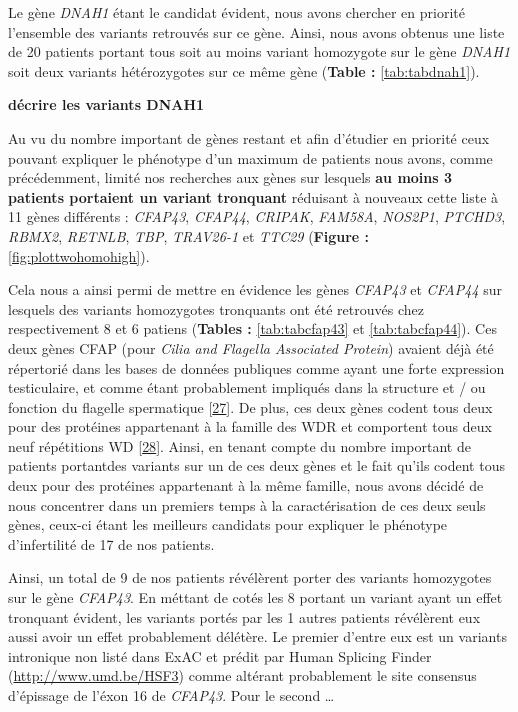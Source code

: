 \documentclass[12pt,twoside]{reedthesis}
\theoremstyle{definition}
\theoremstyle{definition}
\theoremstyle{remark}
\begin{document}
  Le gène \emph{DNAH1} étant le candidat évident, nous avons chercher en
  priorité l'ensemble des variants retrouvés sur ce gène. Ainsi, nous
  avons obtenus une liste de 20 patients portant tous soit au moins
  variant homozygote sur le gène \emph{DNAH1} soit deux variants
  hétérozygotes sur ce même gène (\textbf{Table : }\ref{tab:tabdnah1}).
  
  \textbf{décrire les variants DNAH1}
  
  Au vu du nombre important de gènes restant et afin d'étudier en priorité
  ceux pouvant expliquer le phénotype d'un maximum de patients nous avons,
  comme précédemment, limité nos recherches aux gènes sur lesquels
  \textbf{au moins 3 patients portaient un variant tronquant} réduisant à
  nouveaux cette liste à 11 gènes différents : \emph{CFAP43},
  \emph{CFAP44}, \emph{CRIPAK}, \emph{FAM58A}, \emph{NOS2P1},
  \emph{PTCHD3}, \emph{RBMX2}, \emph{RETNLB}, \emph{TBP}, \emph{TRAV26-1}
  et \emph{TTC29} (\textbf{Figure : }\ref{fig:plottwohomohigh}).
  
  Cela nous a ainsi permi de mettre en évidence les gènes \emph{CFAP43} et
  \emph{CFAP44} sur lesquels des variants homozygotes tronquants ont été
  retrouvés chez respectivement 8 et 6 patiens (\textbf{Tables :
  }\ref{tab:tabcfap43} et \ref{tab:tabcfap44}). Ces deux gènes CFAP (pour
  \emph{Cilia and Flagella Associated Protein}) avaient déjà été
  répertorié dans les bases de données publiques comme ayant une forte
  expression testiculaire, et comme étant probablement impliqués dans la
  structure et / ou fonction du flagelle spermatique
  {[}\protect\hyperlink{ref-Ivliev2012}{27}{]}. De plus, ces deux gènes
  codent tous deux pour des protéines appartenant à la famille des WDR et
  comportent tous deux neuf répétitions WD
  {[}\protect\hyperlink{ref-Smith2008}{28}{]}. Ainsi, en tenant compte du
  nombre important de patients portantdes variants sur un de ces deux
  gènes et le fait qu'ils codent tous deux pour des protéines appartenant
  à la même famille, nous avons décidé de nous concentrer dans un premiers
  temps à la caractérisation de ces deux seuls gènes, ceux-ci étant les
  meilleurs candidats pour expliquer le phénotype d'infertilité de 17 de
  nos patients.
  
  Ainsi, un total de 9 de nos patients révélèrent porter des variants
  homozygotes sur le gène \emph{CFAP43}. En méttant de cotés les 8 portant
  un variant ayant un effet tronquant évident, les variants portés par les
  1 autres patients révélèrent eux aussi avoir un effet probablement
  délétère. Le premier d'entre eux est un variants intronique non listé
  dans ExAC et prédit par Human Splicing Finder
  (\url{http://www.umd.be/HSF3}) comme altérant probablement le site
  consensus d'épissage de l'éxon 16 de \emph{CFAP43}. Pour le second
  \ldots{}
  
\end{document}
